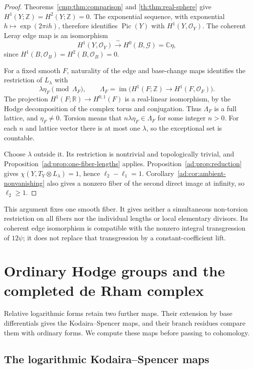 \begin{proof}
Theorems~\ref{cmp:thm:comparison} and
\ref{th:thm:real-sphere} give
$H^1(Y;\mathbb Z)=H^2(Y;\mathbb Z)=0$.
The exponential sequence, with exponential
$h\mapsto\exp(2\pi i h)$, therefore identifies
$\operatorname{Pic}(Y)$ with $H^1(Y,\mathcal O_Y)$.
The coherent Leray edge map is an isomorphism
\[
 H^1(Y,\mathcal O_Y)\xrightarrow{\ \sim\ }
 H^0(B,\mathcal G)=\mathbb C\eta,
\]
since $H^1(B,\mathcal O_B)=H^2(B,\mathcal O_B)=0$.

For a fixed smooth $F$, naturality of the edge and base-change
maps identifies the restriction of $L_\lambda$ with
\[
 \lambda\eta_F\pmod{\Lambda_F},\qquad
 \Lambda_F=\operatorname{im}\bigl(
 H^1(F;\mathbb Z)\longrightarrow H^1(F,\mathcal O_F)\bigr).
\]
The projection $H^1(F;\mathbb R)\to H^{0,1}(F)$ is a
real-linear isomorphism, by the Hodge decomposition of the
complex torus and conjugation. Thus $\Lambda_F$ is a full
lattice, and $\eta_F\ne0$. Torsion means that
$n\lambda\eta_F\in\Lambda_F$ for some integer $n>0$.
For each $n$ and lattice vector there is at most one
$\lambda$, so the exceptional set is countable.

Choose $\lambda$ outside it. Its restriction is nontrivial
and topologically trivial, and
Proposition~\ref{ad:prop:one-fiber-lengths} applies.
Proposition~\ref{ad:prop:reduction} gives
$\chi(Y,T_Y\otimes L_\lambda)=1$, hence
$\ell_2-\ell_1=1$. Corollary~\ref{ad:cor:ambient-nonvanishing}
also gives a nonzero fiber of the second direct image at
infinity, so $\ell_2\ge1$.
\end{proof}

This argument fixes one smooth fiber. It gives neither a
simultaneous non-torsion restriction on all fibers nor the
individual lengths or local elementary divisors. Its coherent
edge isomorphism is compatible with the nonzero integral
transgression of $12\psi$; it does not replace that
transgression by a constant-coefficient lift.

\section{Ordinary Hodge groups and the completed de Rham complex}
\label{sec:hodge-rees}

Relative logarithmic forms retain two further maps. Their
extension by base differentials gives the Kodaira--Spencer
maps, and their branch residues compare them with ordinary
forms. We compute these maps before passing to cohomology.

\subsection{The logarithmic Kodaira--Spencer maps}

